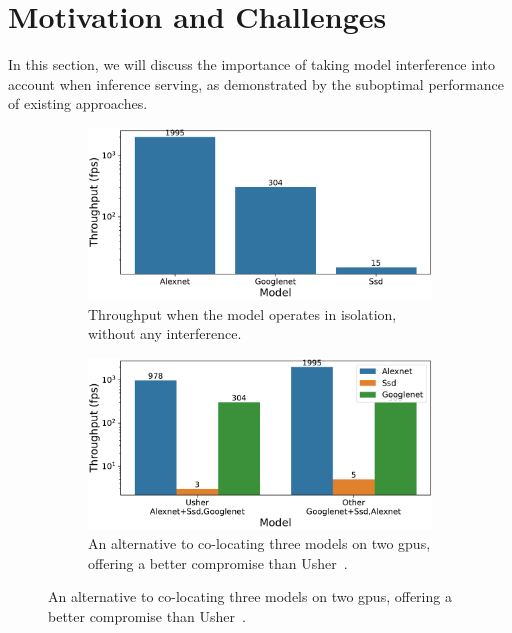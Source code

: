 \section{Motivation and Challenges}\label{sec:motivation}


In this section, we will discuss the importance of taking model interference into account when inference serving, as demonstrated by the suboptimal performance of existing approaches.

\begin{figure}
	\centering
	\begin{subfigure}[t]{0.45\textwidth}
		\centering
		\includegraphics[width=\textwidth]{chapters/roomie/images/Throughput_models_in_isolation.pdf}
		\caption{Throughput when the model operates in isolation, without any interference.}
		\label{fig:isolation}
	\end{subfigure}
	\hfill
	\begin{subfigure}[t]{0.45\textwidth}
		\centering
		\includegraphics[width=\textwidth]{chapters/roomie/images/Throughput_models_in_combinaison.pdf}
		\caption{An alternative to co-locating three models on two \acrshort{gpu}s, offering a better compromise than Usher~\cite{shubha2024usher}.}
		\label{fig:colocation}
	\end{subfigure}
	\label{fig:three graphs}
\end{figure}

